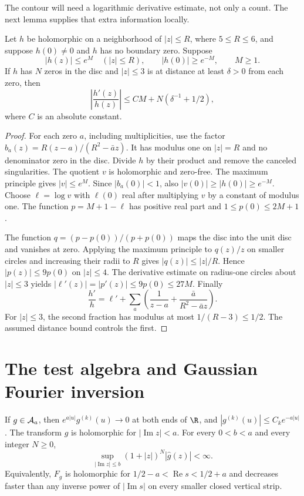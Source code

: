 The contour will need a logarithmic derivative estimate, not only a count.
The next lemma supplies that extra information locally.

\begin{lemma}
\label{lem:local-log}
Let $h$ be holomorphic on a neighborhood of $|z|\leq R$, where
$5\leq R\leq6$, and suppose $h(0)\ne0$ and $h$ has no boundary zero.
Suppose
\[
 |h(z)|\leq e^M\quad(|z|\leq R),\qquad |h(0)|\geq e^{-M},\qquad M\geq1.
\]
If $h$ has $N$ zeros in the disc and $|z|\leq3$ is at distance at least
$\delta>0$ from each zero, then
\[
 \left|\frac{h'(z)}{h(z)}\right|
 \leq C M+N(\delta^{-1}+1/2),
\]
where $C$ is an absolute constant.
\end{lemma}

\begin{proof}
For each zero $a$, including multiplicities, use the factor
$b_a(z)=R(z-a)/(R^2-\bar a z)$.
It has modulus one on $|z|=R$ and no denominator zero in the disc.
Divide $h$ by their product and remove the canceled singularities.
The quotient $v$ is holomorphic and zero-free.
The maximum principle gives $|v|\leq e^M$.
Since $|b_a(0)|<1$, also $|v(0)|\geq|h(0)|\geq e^{-M}$.
Choose $\ell=\log v$ with $\ell(0)$ real after multiplying $v$ by a constant
of modulus one.  The function $p=M+1-\ell$ has positive real part and
$1\leq p(0)\leq2M+1$.

The function $q=(p-p(0))/(p+p(0))$ maps the disc into the unit disc and
vanishes at zero.  Applying the maximum principle to $q(z)/z$ on smaller
circles and increasing their radii to $R$ gives $|q(z)|\leq|z|/R$.
Hence $|p(z)|\leq9p(0)$ on $|z|\leq4$.
The derivative estimate on radius-one circles about $|z|\leq3$ yields
$|\ell'(z)|=|p'(z)|\leq9p(0)\leq27M$.
Finally
\[
 \frac{h'}h=\ell'+\sum_a
 \left(\frac1{z-a}+\frac{\bar a}{R^2-\bar a z}\right).
\]
For $|z|\leq3$, the second fraction has modulus at most $1/(R-3)\leq1/2$.
The assumed distance bound controls the first.
\end{proof}

\section{The test algebra and Gaussian Fourier inversion}
\label{sec:tests}

\begin{lemma}
\label{lem:test-bounds}
If $g\in\mathcal A_a$, then $e^{a|u|}g^{(k)}(u)\to0$ at both ends of $\R$,
and $|g^{(k)}(u)|\leq C_k e^{-a|u|}$.
The transform $\widehat g$ is holomorphic for $|\operatorname{Im}z|<a$.
For every $0<b<a$ and every integer $N\geq0$,
\begin{equation}
 \sup_{|\operatorname{Im}z|\leq b}(1+|z|)^N|\widehat g(z)|<\infty.
 \label{eq:strip-decay}
\end{equation}
Equivalently, $F_g$ is holomorphic for $1/2-a<\operatorname{Re}s<1/2+a$
and decreases faster than any inverse power of $|\operatorname{Im}s|$
on every smaller closed vertical strip.
\end{lemma}

